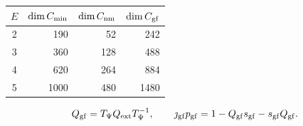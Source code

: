 \begin{tabular}{c|rrr}
$E$ & $\dim C_{\rm min}$ & $\dim C_{\rm nm}$ & $\dim C_{\rm gf}$ \\
\hline
2 & 190 & 52 & 242 \\
3 & 360 & 128 & 488 \\
4 & 620 & 264 & 884 \\
5 & 1000 & 480 & 1480 \\
\end{tabular}

\[
Q_{\rm gf}=T_\Psi Q_{\rm ext}T_\Psi^{-1},\qquad
\jmath_{\rm gf}p_{\rm gf}=1-Q_{\rm gf}s_{\rm gf}-s_{\rm gf}Q_{\rm gf}.
\]

